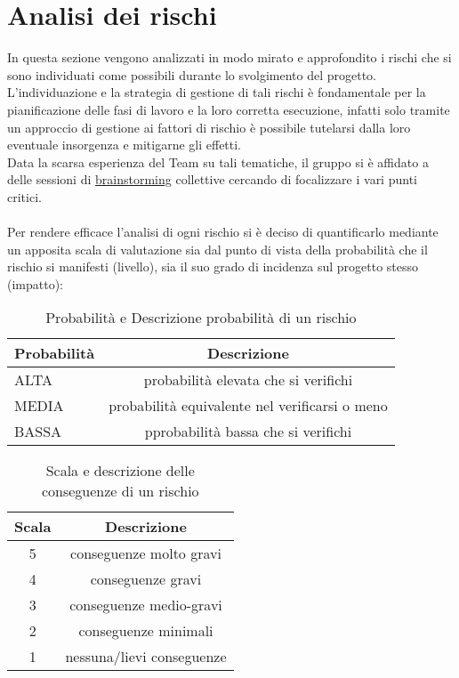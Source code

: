 \section{Analisi dei rischi}
In questa sezione vengono analizzati in modo mirato e approfondito i rischi che si sono individuati come possibili durante lo svolgimento del progetto. L'individuazione e la strategia di gestione di tali rischi è fondamentale per la pianificazione delle fasi di lavoro e la loro corretta esecuzione, infatti solo tramite un approccio di gestione ai fattori di rischio è possibile tutelarsi dalla loro eventuale insorgenza e mitigarne gli effetti.\\
Data la scarsa esperienza del Team su tali tematiche, il gruppo si è affidato a delle sessioni di \underline{brainstorming} collettive cercando di focalizzare i vari punti critici. \\\\
Per rendere efficace l'analisi di ogni rischio si è deciso di quantificarlo mediante un apposita scala di valutazione sia dal punto di vista della probabilità che il rischio si manifesti (livello), sia il suo grado di incidenza sul progetto stesso (impatto):\\
\begin{table}[h!]
\centering
\begin{tabular}{|l|c|}
\hline
Probabilità& Descrizione\\
\hline
ALTA & probabilità elevata che si verifichi\\
MEDIA & probabilità equivalente nel verificarsi o meno\\
BASSA & pprobabilità bassa che si verifichi\\
\hline
\end{tabular}
\caption{Probabilità e Descrizione probabilità di un rischio}\label{tab:livellorischi}
\end{table}
\begin{table}[h!]
\centering
\begin{tabular}{|c|c|}
\hline
Scala& Descrizione  \\
\hline
5 & conseguenze molto gravi\\
4 & conseguenze gravi\\
3 & conseguenze medio-gravi\\
2 & conseguenze minimali\\
1 & nessuna/lievi conseguenze\\
\hline
\end{tabular}
\caption{Scala e descrizione delle conseguenze di un rischio}\label{tab:impattorischi}
\end{table}

